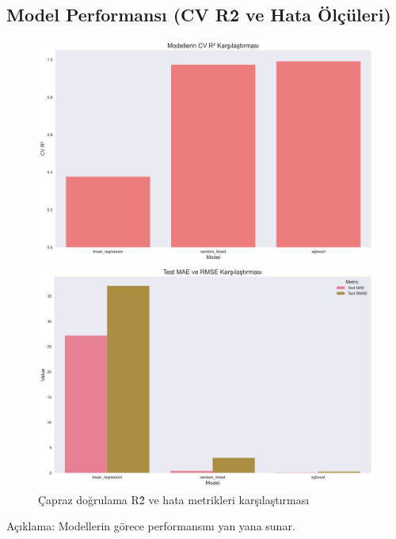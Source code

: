 \documentclass[12pt,a4paper]{article}
\begin{document}
\subsection{Model Performansı (CV R\^2 ve Hata Ölçüleri)}
\begin{figure}[H]
    \centering
    \begin{minipage}{0.49\textwidth}
        \centering
        \includegraphics[width=\textwidth]{20_model_cv_r2.png}
    \end{minipage}
    \begin{minipage}{0.49\textwidth}
        \centering
        \includegraphics[width=\textwidth]{21_model_mae_rmse.png}
    \end{minipage}
    \caption{Çapraz doğrulama R\^2 ve hata metrikleri karşılaştırması}
\end{figure}

\noindent Açıklama: Modellerin görece performansını yan yana sunar.
\end{document}
